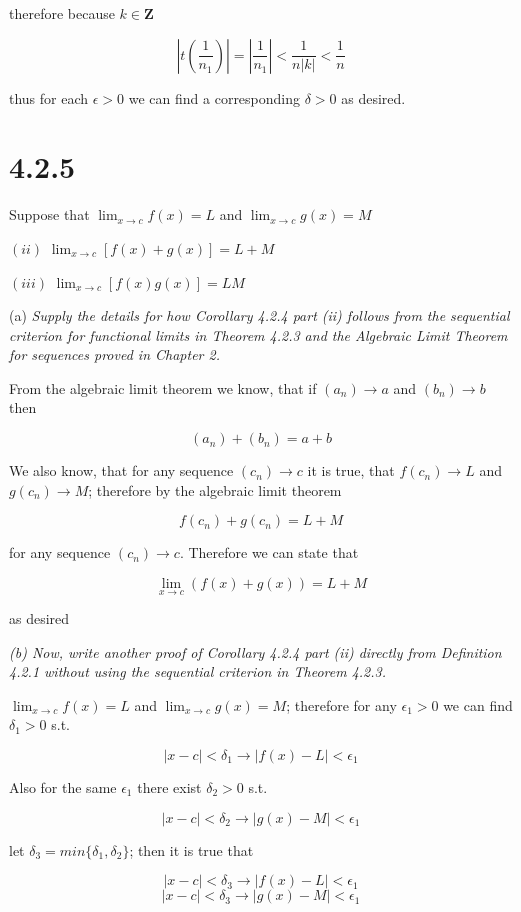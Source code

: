 \documentclass[11pt,oneside,titlepage]{book}
\begin{document}
therefore because $k \in \textbf{Z}$

$$ |t(\frac{1}{n_1})| = |\frac{1}{n_1}| <  \frac{1}{n|k|} < \frac{1}{n}$$

thus for each $\epsilon > 0$ we can find a corresponding $\delta > 0$ as desired.

\section*{4.2.5}
Suppose that $\lim_{x \to c} f(x) = L$ and $\lim_{x \to c} g(x) = M$

$(ii)$ $\lim_{x \to c}[f(x) + g(x)] = L + M$

$(iii)$ $\lim_{x \to c}[f(x) g(x)] = L M$

(a)\textit{ Supply the details for how Corollary 4.2.4 part (ii) follows from the sequential criterion for functional limits in Theorem 4.2.3 and the Algebraic Limit Theorem for sequences proved in Chapter 2.}

From the algebraic limit theorem we know, that if $(a_n) \to a$ and $(b_n) \to b$ then

$$(a_n) + (b_n) = a + b$$

We also know, that for any sequence $(c_n) \to c$ it is true, that $f(c_n) \to L$ and $g(c_n) \to M$;
therefore by the algebraic limit theorem

$$f(c_n) + g(c_n) = L + M$$

for any sequence $(c_n) \to c$. Therefore we can state that

$$\lim_{x \to c}(f(x) + g(x)) = L + M $$

as desired

\textit{(b) Now, write another proof of Corollary 4.2.4 part (ii) directly from Definition 4.2.1 without using the sequential criterion in Theorem 4.2.3.}

$\lim_{x \to c} f(x) = L$ and $\lim_{x \to c} g(x) = M$; therefore for any $\epsilon_1 > 0$ we can find $\delta_1 > 0$ s.t.

$$ |x - c| < \delta_1 \to |f(x) - L| < \epsilon_1 $$

Also for the same $\epsilon_1$ there exist $\delta_2 > 0$ s.t.

$$ |x - c| < \delta_2 \to |g(x) - M| < \epsilon_1 $$

let $\delta_3 = min\{\delta_1, \delta_2\}$; then it is true that 

$$ |x - c| < \delta_3 \to |f(x) - L| < \epsilon_1 $$
$$ |x - c| < \delta_3 \to |g(x) - M| < \epsilon_1 $$
\end{document}
